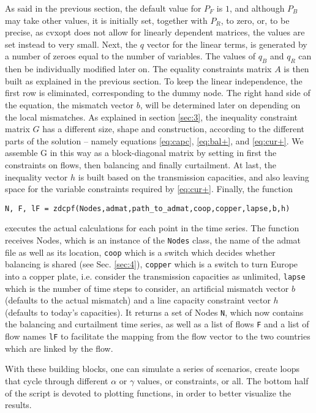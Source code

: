 \documentclass[english,twoside,a4paper,11pt]{article}
\numberwithin{equation}{section}
\begin{document}
As said in the previous section, the default value for $P_F$ is $1$,
and although $P_B$ may take other values, it is initially set,
together with $P_R$, to zero, or, to be precise, as cvxopt does not
allow for linearly dependent matrices, the values are set instead to
very small. Next, the $q$ vector for the linear terms, is generated by
a number of zeroes equal to the number of variables. The values of
$q_B$ and $q_R$ can then be individually modified later on. The equality
constraints matrix $A$ is then built as explained in the previous
section. To keep the linear independence, the first row is eliminated,
corresponding to the dummy node. The right hand side of the equation,
the mismatch vector $b$, will be determined later on depending on the
local mismatches. As explained in section \ref{sec:3}, the inequality
constraint matrix $G$ has a different size, shape and construction,
according to the different parts of the solution – namely equations
\eqref{eq:capc}, \eqref{eq:bal+}, and \eqref{eq:cur+}. We assemble G
in this way as a block-diagonal matrix by setting in first
the constraints on flows, then balancing and finally
curtailment. At last, the inequality vector $h$ is built based
on the transmission capacities, and also leaving space for the
variable constraints required by \eqref{eq:cur+}. Finally, the function 

\noindent
\texttt{N, F, lF = zdcpf(Nodes,admat,path\_to\_admat,coop,copper,lapse,b,h)}

executes the actual calculations for each point in the time
series. The function receives Nodes, which is an instance of the
\texttt{Nodes} class, the name of the admat file as well as its
location, \texttt{coop} which is a switch which decides whether
balancing is shared (see Sec. \ref{sec:4}), \texttt{copper} which is a
switch to turn Europe into a copper plate, i.e. consider the
transmission capacities as unlimited, \texttt{lapse} which is the
number of time steps to consider, an artificial mismatch vector $b$
(defaults to the actual mismatch) and a line capacity constraint
vector $h$ (defaults to today's capacities). It returns a set of Nodes
\texttt{N}, which now contains the balancing and curtailment
time series, as well as a list of flows \texttt{F} and a list of flow
names \texttt{lF} to facilitate the mapping from the flow vector to
the two countries which are linked by the flow.

With these building blocks, one can simulate a series of scenarios,
create loops that cycle through different $\alpha$ or $\gamma$ values,
or constraints, or all. The bottom half of the script is devoted to
plotting functions, in order to better visualize the results. 
\end{document}
